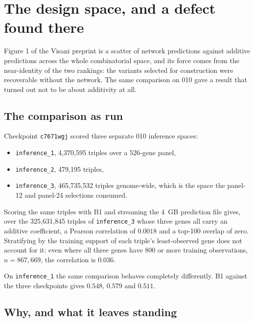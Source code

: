 
\section{The design space, and a defect found there}
\label{sec:design}

Figure 1 of the Visani preprint is a scatter of network predictions against
additive predictions across the whole combinatorial space, and its force comes
from the near-identity of the two rankings: the variants selected for
construction were recoverable without the network. The same comparison on 010
gave a result that turned out not to be about additivity at all.

\subsection{The comparison as run}

Checkpoint \texttt{c7671wgj} scored three separate 010 inference spaces:

\begin{itemize}
\item \texttt{inference\_1}, 4{,}370{,}595 triples over a 526-gene panel,
\item \texttt{inference\_2}, 479{,}195 triples,
\item \texttt{inference\_3}, 465{,}735{,}532 triples genome-wide, which is the
  space the panel-12 and panel-24 selections consumed.
\end{itemize}

Scoring the same triples with B1 and streaming the 4~GB prediction file gives,
over the 325{,}631{,}845 triples of \texttt{inference\_3} whose three genes all
carry an additive coefficient, a Pearson correlation of $0.0018$ and a top-100
overlap of zero. Stratifying by the training support of each triple's
least-observed gene does not account for it: even where all three genes have 800
or more training observations, $n = 867{,}669$, the correlation is $0.036$.

On \texttt{inference\_1} the same comparison behaves completely differently. B1
against the three checkpoints gives $0.548$, $0.579$ and $0.511$.

\subsection{Why, and what it leaves standing}
\label{sec:offby28}

